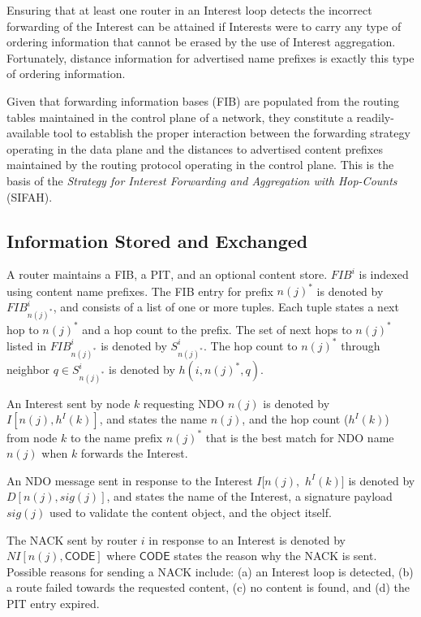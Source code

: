 \documentclass{ancs15-alternate}
\begin{document}
Ensuring that at least one router in an Interest loop detects the incorrect forwarding of the Interest  can be attained if Interests were to carry  any type of ordering information that cannot be erased by the use of Interest aggregation.
Fortunately, distance information for advertised name prefixes is exactly this type of ordering information. 

Given that 
forwarding information bases (FIB)  are populated from the routing tables maintained in the control plane of a network, they  constitute  
a readily-available tool to establish the proper interaction between the forwarding strategy operating in the data plane and the distances to advertised content prefixes maintained by the routing protocol  operating in the control plane.  This is the basis of the 
{\em Strategy for Interest  Forwarding and Aggregation with Hop-Counts} (SIFAH).


\subsection{Information Stored and Exchanged}

A router maintains a FIB, a PIT, and an optional  content store.
$FIB^i$ is indexed using content name prefixes. The  FIB entry for  prefix $n(j)^*$ is denoted by $FIB^i_{n(j)^*}$, and consists of a list of one or more  tuples. Each tuple 
states a next hop to $n(j)^*$ and a hop count to the prefix.
The set of next hops to $n(j)^*$ listed in $FIB^i_{n(j)^*}$ is denoted by
$S^i_{n(j)^*}$.
The hop count to $n(j)^*$ through neighbor $q \in S^i_{n(j)^*}$ is denoted by  $h(i, n(j)^*, q)$. 


An Interest sent by node $k$ requesting NDO $n(j)$ is denoted by  $I[n(j), h^I (k) ]$, and states the name $n(j)$, and the hop count ($h^I (k)$) from node  $k$ to the name prefix $n(j)^*$ that is the best match for NDO name $n(j)$  when $k$ forwards the Interest. 


An NDO message sent in response to the Interest $I[n(j),$ $h^I (k) ]$ is denoted by  $D[n(j), sig(j) ]$, and  states the name  of the Interest,  a  signature payload $sig(j)$ used to validate the content object, and the object  itself. 

The NACK sent by router $i$ in response to  an Interest 
is denoted by $NI[n(j),  \mathsf{CODE}]$  where $\mathsf{CODE}$ states the reason why the NACK is sent.  Possible reasons for sending a NACK include: (a) an Interest loop is detected, (b) a  route failed towards the requested content, (c) no content is found, and (d) the PIT entry expired.
\end{document}
